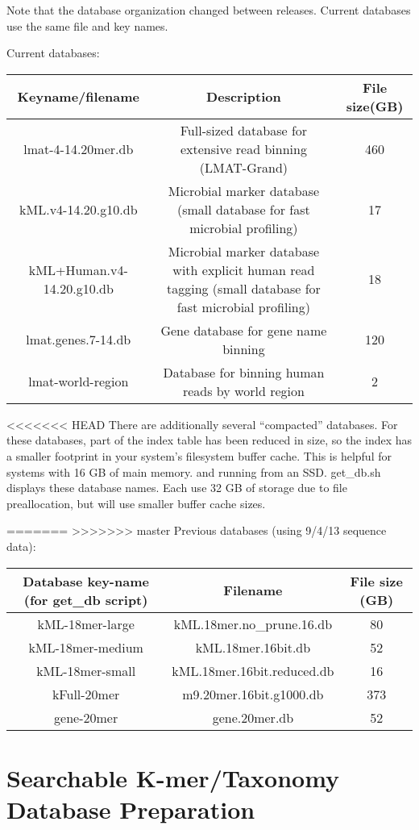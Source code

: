 \documentclass[11pt]{article}
\begin{document}
Note that the database organization changed between releases.  Current databases use the same file and key names.  

Current databases:


\begin{tabular}{| c | c | c |}
\hline
Keyname/filename & Description & File size(GB) \\
\hline
lmat-4-14.20mer.db & Full-sized database for extensive read binning (LMAT-Grand) & 460 \\
\hline
kML.v4-14.20.g10.db & Microbial marker database (small database for fast microbial profiling) & 17 \\
\hline
kML+Human.v4-14.20.g10.db & Microbial marker database with explicit human read tagging (small database for fast microbial profiling) & 18 \\
\hline
lmat.genes.7-14.db & Gene database for gene name binning & 120 \\
\hline
lmat-world-region & Database for binning human reads by world region & 2 \\
\hline
\end{tabular}

<<<<<<< HEAD
There are additionally several ``compacted'' databases.  For these databases, part of the index table has been reduced in size, so the index has a smaller footprint in your system's filesystem buffer cache.  This is helpful for systems with 16 GB of main memory. and running from an SSD.  get\_db.sh displays these database names.  Each use 32 GB of storage due to file preallocation, but will use smaller buffer cache sizes.

=======
>>>>>>> master
Previous databases (using 9/4/13 sequence data):

\begin{tabular}{| c | c | c |}
\hline
Database key-name (for get\_db script) & Filename & File size (GB) \\
\hline
kML-18mer-large & kML.18mer.no\_prune.16.db & 80 \\
\hline
kML-18mer-medium & kML.18mer.16bit.db  & 52 \\
\hline
kML-18mer-small & kML.18mer.16bit.reduced.db  & 16 \\
\hline
kFull-20mer & m9.20mer.16bit.g1000.db & 373 \\
\hline
gene-20mer & gene.20mer.db & 52 \\
\hline
\end{tabular}

\section{Searchable K-mer/Taxonomy Database Preparation}
\end{document}
